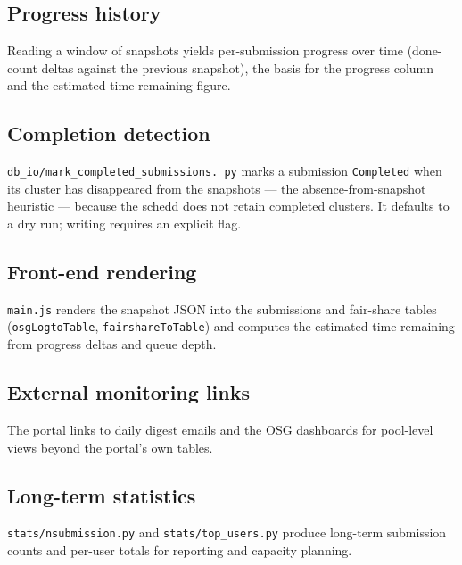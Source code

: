 \subsection{Progress history}

Reading a window of snapshots yields per-submission progress over time (done-count deltas against the previous
snapshot), the basis for the progress column and the estimated-time-remaining figure.

\subsection{Completion detection}

\texttt{db\_\allowbreak{}io/\allowbreak{}mark\_\allowbreak{}completed\_\allowbreak{}submissions.\allowbreak{}%
py} marks a submission \texttt{Completed} when its cluster has disappeared from the snapshots --- the
absence-from-snapshot heuristic --- because the schedd does not retain completed clusters. It defaults to a dry
run; writing requires an explicit flag.

\subsection{Front-end rendering}

\texttt{main.\allowbreak{}js} renders the snapshot JSON into the submissions and fair-share tables
(\texttt{osgLogtoTable}, \texttt{fairshareToTable}) and computes the estimated time remaining from progress
deltas and queue depth.

\subsection{External monitoring links}

The portal links to daily digest emails and the OSG dashboards for pool-level views beyond the portal's own
tables.

\subsection{Long-term statistics}

\texttt{stats/\allowbreak{}nsubmission.\allowbreak{}py} and
\texttt{stats/\allowbreak{}top\_\allowbreak{}users.\allowbreak{}py} produce long-term submission counts and
per-user totals for reporting and capacity planning.
